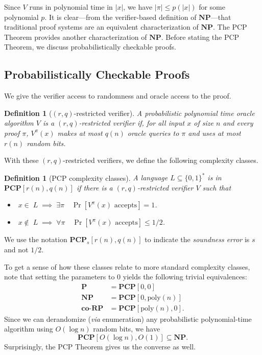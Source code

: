 \documentclass{article}
\newtheorem{definition}[theorem]{Definition}
\newcommand{\poly}{{\mathrm{poly}}}
\newcommand{\bits}{\{0,1\}}
\newcommand{\class}[1]{\mathbf{#1}}
\newcommand{\coclass}[1]{\mathbf{co\mbox{-}#1}} %
\newcommand{\NP}{\class{NP}}
\newcommand{\PCP}{\class{PCP}}
\newcommand{\coRP}{\coclass{RP}}
\renewcommand{\P}{\class{P}}
\begin{document}
Since $V$ runs in polynomial time in $|x|$, we have
$|\pi| \le p(|x|)$ for some polynomial $p$.
It is clear---from the verifier-based definition of $\NP$---that traditional proof
systems are an equivalent characterization of $\NP$.
The PCP Theorem provides another characterization of $\NP$.
Before stating the PCP Theorem, we discuss probabilistically checkable proofs.

%
%
%
%
%
%


\subsection{Probabilistically Checkable Proofs}

We give the verifier access to randomness and oracle access to the proof.

\begin{definition}[$(r, q)$-restricted verifier]
A probabilistic polynomial time oracle algorithm $V$ is a \emph{$(r, q)$-restricted verifier} if,
for all input $x$ of size $n$ and every proof $\pi$, $V^\pi(x)$ makes at most $q(n)$ oracle queries
to $\pi$ and uses at most $r(n)$ random bits.
\end{definition}

With these $(r, q)$-restricted verifiers, we define the following complexity classes.

\begin{definition}[PCP complexity classes]
A language $L\subseteq\bits^*$ is in $\PCP[r(n), q(n)]$ if there is a
$(r, q)$-restricted verifier $V$ such that
\begin{itemize}[leftmargin=10em]
\item[\textbf{(Completeness)}] $\;x \in\; L \;\implies\; \exists \pi \quad \Pr[V^\pi(x) \text{ accepts}] = 1$.
\item[\textbf{(Soundness)}] $\;x \notin\; L \;\implies\; \forall \pi \quad \Pr[V^\pi(x) \text{ accepts}] \le 1/2$.
\end{itemize}
\end{definition}
We use the notation $\PCP_s[r(n), q(n)]$ to indicate the \emph{soundness error} is $s$ and not $1/2$.

To get a sense of how these classes relate to more standard complexity classes,
note that setting the parameters to $0$ yields the following trivial equivalences:
\begin{align*}
\P &= \PCP[0, 0] \\
\NP &= \PCP[0, \poly(n)] \\
\coRP &= \PCP[\poly(n), 0].
\end{align*}
Since we can derandomize (\emph{via} enumeration) any probabilistic polynomial-time algorithm
using $O(\log n)$ random bits, we have
$$
\PCP[O(\log n), O(1)] \subseteq \NP.
$$
Surprisingly, the PCP Theorem gives us the converse as well.
\end{document}
